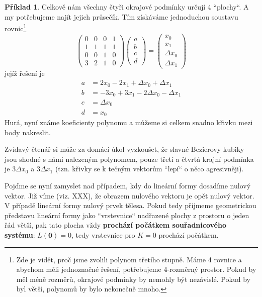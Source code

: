 \documentclass[a5paper,12pt]{amsbook}
\theoremstyle{definition}
\newtheorem{example}{Příklad}[chapter]
\newcommand{\myscalar}[1]{#1}
\newcommand{\myvec}[1]{\bm{#1}}
\newcommand{\mymap}[1]{#1}
\begin{document}
\begin{example}
Celkově nám všechny čtyři okrajové podmínky určují 4 ``plochy``. A my potřebujeme najít jejich
průsečík. Tím získáváme jednoduchou soustavu rovnic\footnote{
  Zde je vidět, proč jsme zvolili polynom třetího stupně. Máme 4 rovnice a abychom měli
  jednoznačné řešení, potřebujeme 4-rozměrný prostor. Pokud by měl méně rozměrů, okrajové
  podmínky by nemohly být nezávislé. Pokud by byl větší, polynomů by bylo nekonečně mnoho.
}
\begin{equation*}
\left(\begin{array}{cccc}
0 & 0 & 0 & 1\\
1 & 1 & 1 & 1\\
0 & 0 & 1 & 0\\
3 & 2 & 1 & 0
\end{array}\right)\left(\begin{array}{c}
a\\
b\\
c\\
d
\end{array}\right)=\left(\begin{array}{c}
x_0\\
x_1\\
\Delta x_0\\
\Delta x_1
\end{array}\right)
\end{equation*}
jejíž řešení je
\begin{equation*}
\begin{split}
a &= 2x_0 - 2x_1 + \Delta x_0 + \Delta x_1\\
b &= -3x_0 + 3x_1 - 2\Delta x_0 - \Delta x_1\\
c &= \Delta x_0\\
d &= x_0
\end{split}
\end{equation*}
Hurá, nyní známe koeficienty polynomu a můžeme si celkem snadno křivku mezi body nakreslit.

Zvídavý čtenář si může za domácí úkol vyzkoušet, že slavné Bezierovy kubiky jsou shodné s námi
nalezeným polynomem, pouze třetí a čtvrtá krajní podmínka je $3\Delta x_0$ a $3\Delta x_1$ (tzn.
křivky se k tečným vektorům ``lepí`` o něco agresivněji).

\end{example}

\noindent Pojďme se nyní zamyslet nad případem, kdy do lineární formy dosadíme nulový vektor. Již víme
(viz. XXX), že obrazem nulového vektoru je opět nulový vektor. V případě lineární formy nulový
prvek tělesa. Pokud tedy přijmeme geometrickou představu lineární formy jako ``vrstevnice``
nadřazené plochy z prostoru o jeden řád větší, pak tato plocha vždy \textbf{prochází počátkem
souřadnicového systému}: $\mymap{L}(\myvec{0}) = \myscalar{0}$, tedy vrstevnice pro $K = 0$ prochází
počátkem.
\end{document}
